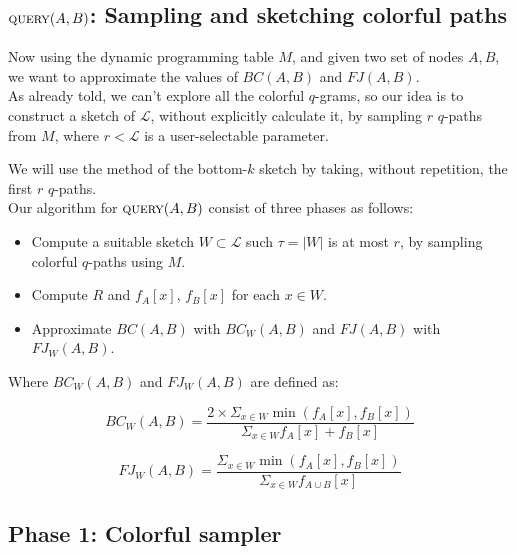 \subsection*{$\textsc{query}(A,B)$: Sampling and sketching colorful paths}

Now using the dynamic programming table $M$, and given two set of nodes $A, B$, 
we want to approximate the values of $BC(A,B)$ and $FJ(A,B)$.\\

As already told, we can't explore all the colorful $q$-grams, so our idea is to 
construct a sketch of $\mathcal{L}$, without explicitly calculate it, 
by sampling $r$ $q$-paths from $M$, where $r < \mathcal{L}$ is a user-selectable parameter.

We will use the method of the bottom-$k$ sketch by taking, without repetition, the first $r$ $q$-paths. \\

Our algorithm for $\textsc{query}(A,B)$ consist of three phases as follows:

\begin{itemize}
	\item Compute a suitable sketch $W \subset \mathcal{L}$ such $\tau = |W|$ is at most $r$, by sampling colorful $q$-paths using $M$.
	\item Compute $R$ and $f_{A}[x]$, $f_{B}[x]$ for each $x \in W$.
	\item Approximate $BC(A,B)$ with $BC_{W}(A,B)$ and $FJ(A,B)$ with $FJ_{W}(A,B)$.
\end{itemize}

Where $BC_{W}(A,B)$ and $FJ_{W}(A,B)$ are defined as:

\begin{equation}		
	BC_{W}(A,B) = \frac{ 2 \times \Sigma_{x \in W} \min(f_{A}[x], f_{B}[x]) }{ \Sigma_{x \in W} f_{A}[x] + f_{B}[x] }
\end{equation}

\begin{equation}	
	FJ_{W}(A,B) = \frac{ \Sigma_{x \in W} \min(f_{A}[x], f_{B}[x]) }{ \Sigma_{x \in W} f_{A \cup B}[x] }
\end{equation}

\subsection*{Phase 1: Colorful sampler}


